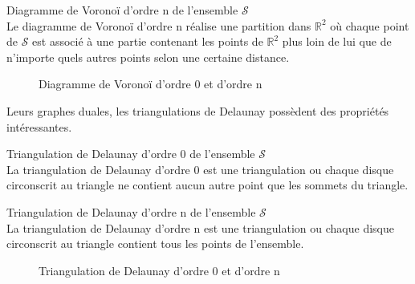  \begin{Definition}{Diagramme de Voronoï d'ordre n de l'ensemble $\mathcal{S}$}\\
\label{def:tri-vor-n}
   Le diagramme de Voronoï d'ordre n réalise une partition dans $\mathbb{R}^2$ où chaque point de $\mathcal{S}$ est associé à une partie contenant les points de $\mathbb{R}^2$ plus loin de lui que de n'importe quels autres points selon une certaine distance.
\end{Definition}

\begin{figure}[h!]
  \centering
  \caption{Diagramme de Voronoï d'ordre 0 et d'ordre n}
\end{figure}

Leurs graphes duales, les triangulations de Delaunay possèdent des propriétés intéressantes.

\begin{Definition}{Triangulation de Delaunay d'ordre 0 de l'ensemble $\mathcal{S}$}\\
\label{def:tri-del-0}
  La triangulation de Delaunay d'ordre 0 est une triangulation ou chaque disque circonscrit au triangle ne contient aucun autre point que les sommets du triangle.
\end{Definition}

\begin{Definition}{Triangulation de Delaunay d'ordre n de l'ensemble $\mathcal{S}$}\\
\label{def:tri-del-n}
  La triangulation de Delaunay d'ordre n est une triangulation ou chaque disque circonscrit au triangle contient tous les points de l'ensemble.
\end{Definition}

\begin{figure}[h!]
  \centering
  \caption{Triangulation de Delaunay d'ordre 0 et d'ordre n}
\end{figure}

